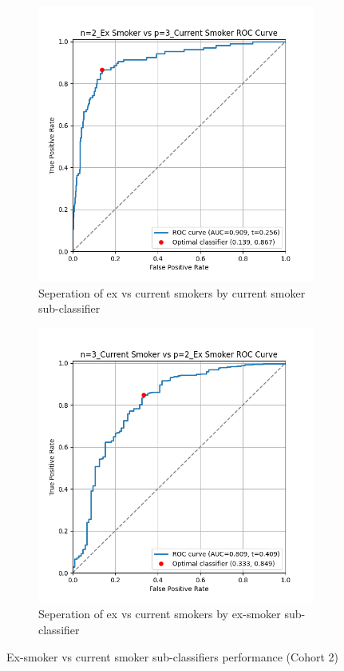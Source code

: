 \documentclass{article}
\begin{document}
\begin{figure}
    \begin{subfigure}{0.48\textwidth}
        \centering
        \includegraphics[width=\linewidth]{cohort2_2v3_roc.png}
        \caption{Seperation of ex vs current smokers by current smoker sub-classifier}
    \end{subfigure}
    \hfill
    \begin{subfigure}{0.48\textwidth}
        \centering
        \includegraphics[width=\linewidth]{cohort2_3v2_roc.png}
        \caption{Seperation of ex vs current smokers by ex-smoker sub-classifier}
    \end{subfigure}
    \caption{Ex-smoker vs current smoker sub-classifiers performance (Cohort 2)}
\end{figure}
\end{document}
